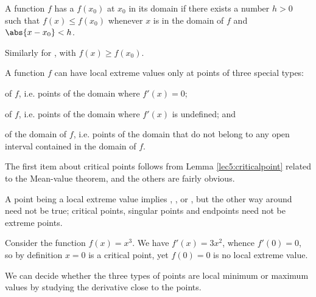 \begin{definition}
	A function $f$ has a  $f(x_0)$ at $x_0$ in its domain if there exists a number $h > 0$ such that $f(x) \leq f(x_0)$ whenever $x$ is in the domain of $f$ and $\abs{x - x_0} < h$.

	Similarly for , with $f(x) \geq f(x_0)$.
\end{definition}

\noindent
A function $f$ can have local extreme values only at points of three special types:
\begin{romanlist}
	\item {} of $f$, i.e. points of the domain where $f'(x) = 0$;
	\item {} of $f$, i.e. points of the domain where $f'(x)$ is undefined; and
	\item {} of the domain of $f$, i.e. points of the domain that do not belong to any open interval contained in the domain of $f$.
\end{romanlist}

\noindent
The first item about critical points follows from Lemma \ref{lec5:criticalpoint} related to the Mean-value theorem, and the others are fairly obvious.

A point being a local extreme value implies , , or , but the other way around need not be true; critical points, singular points and endpoints need not be extreme points.

\begin{counterexample}
	Consider the function $f(x) = x^3$.
	We have $f'(x) = 3 x^2$, whence $f'(0) = 0$, so by definition $x = 0$ is a critical point, yet $f(0) = 0$ is no local extreme value.
\end{counterexample}

\noindent
We can decide whether the three types of points are local minimum or maximum values by studying the derivative close to the points.

